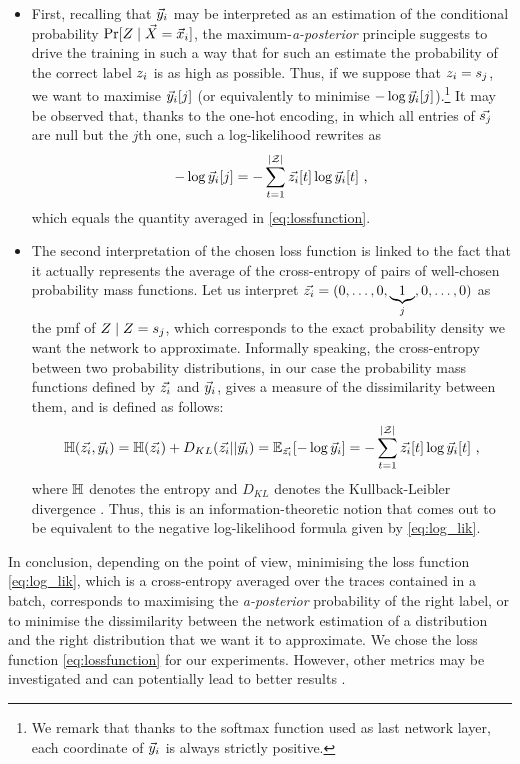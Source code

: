 \begin{itemize}
\item First, recalling that $\vec{y}_i$ may be interpreted as an estimation of the conditional probability $\prob[\given{\sensRandVar}{\vaLeakVec=\vLeakVec_i}]$, the maximum-\textit{a-posterior} principle suggests to drive the training in such a way that for such an estimate the probability of the correct label $z_i$ is as high as possible. Thus, if we suppose that $z_i = s_{j}$, we want to maximise $\vec{y}_i[j]$ (or equivalently to minimise $-\log{\ensuremath {\vec{y}}_i[j]}$).\footnote{We remark that thanks to the softmax function used as last network layer, each coordinate of $\vec{y}_i$ is always strictly positive.} It may be observed that, thanks to the one-hot encoding, in which all entries of $\vec{s_{j}}$ are null but the $j$th one, such a log-likelihood rewrites as 
\begin{equation}\label{eq:log_lik}
-\log{\ensuremath {\vec{y}}_i[j]} = -\sum_{t=1}^{|\mathcal{Z}|}\vec{z_i}[t]\log{\ensuremath {\vec{y}}_i[t]} \mbox{ ,}
\end{equation}
which equals the quantity averaged in \eqref{eq:lossfunction}.
\item The second interpretation of the chosen loss function is linked to the fact that it actually represents the average of  the cross-entropy of pairs of well-chosen probability mass functions. Let us interpret $\vec{z_i} = (0,\ldots , 0,\underbrace{1}_{j},0,\dots,0)$ as the pmf of $\given{\sensRandVar}{\sensRandVar = \sensVarValue{j}}$, which corresponds to the exact probability density we want the network to approximate. Informally speaking, the cross-entropy between two probability distributions, in our case the probability mass functions defined by $\vec{z_i}$ and $\vec{y}_i$, gives a measure of the dissimilarity between them, and is defined as follows:
\begin{equation}\label{eq:crossentropy}
\mathbb{H}(\vec{z_i}, \vec{y}_i) = \mathbb{H}(\vec{z_i}) + D_{KL}(\vec{z_i} || \vec{y}_i) = \mathbb{E}_{\vec{z_i}}[-\log{\ensuremath {\vec{y}}_i}] = -\sum_{t=1}^{|\mathcal{Z}|}\vec{z_i}[t]\log{\ensuremath {\vec{y}}_i[t]} \mbox{ ,}
\end{equation}
where $\mathbb{H}$ denotes the entropy and $D_{KL}$ denotes the Kullback-Leibler divergence \cite{christopher2006pattern}. Thus, this is an information-theoretic notion that comes out to be equivalent to the negative log-likelihood formula given by \eqref{eq:log_lik}. 
\end{itemize}
In conclusion, depending on the point of view, minimising the loss function \eqref{eq:log_lik}, which is a cross-entropy averaged over the traces contained in a batch, corresponds to maximising the \textit{a-posterior} probability of the right label, or to minimise the dissimilarity between the network estimation of a distribution and the right distribution that we want it to approximate. 
We chose the loss function \eqref{eq:lossfunction} for our experiments. However, other metrics may be investigated and can
potentially lead to better results \cite{MHK10,SSZU15}. \\

